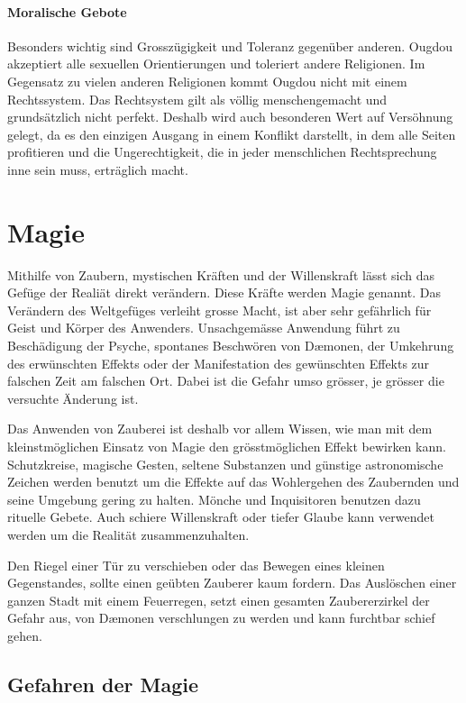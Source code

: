\documentclass[10pt,twoside,twocolumn,openany]{book}
\begin{document}
\subsubsection{Moralische Gebote}
Besonders wichtig sind Grosszügigkeit und Toleranz gegenüber anderen. Ougdou akzeptiert alle sexuellen Orientierungen und toleriert andere Religionen. Im Gegensatz zu vielen anderen Religionen kommt Ougdou nicht mit einem Rechtssystem. Das Rechtsystem gilt als völlig menschengemacht und grundsätzlich nicht perfekt. Deshalb wird auch besonderen Wert auf Versöhnung gelegt, da es den einzigen Ausgang in einem Konflikt darstellt, in dem alle Seiten profitieren und die Ungerechtigkeit, die in jeder menschlichen Rechtsprechung inne sein muss, erträglich macht.


\chapter{Magie}

Mithilfe von Zaubern, mystischen Kräften und der Willenskraft lässt sich das Gefüge der Realiät direkt verändern. Diese Kräfte werden Magie genannt. Das Verändern des Weltgefüges verleiht grosse Macht, ist aber sehr gefährlich für Geist und Körper des Anwenders. Unsachgemässe Anwendung führt zu Beschädigung der Psyche, spontanes Beschwören von D\ae monen, der Umkehrung des erwünschten Effekts oder der Manifestation des gewünschten Effekts zur falschen Zeit am falschen Ort. Dabei ist die Gefahr umso grösser, je grösser die versuchte Änderung ist.

Das Anwenden von Zauberei ist deshalb vor allem Wissen, wie man mit dem kleinstmöglichen Einsatz von Magie den grösstmöglichen Effekt bewirken kann. Schutzkreise, magische Gesten, seltene Substanzen und günstige astronomische Zeichen werden benutzt um die Effekte auf das Wohlergehen des Zaubernden und seine Umgebung gering zu halten. Mönche und Inquisitoren benutzen dazu rituelle Gebete. Auch schiere Willenskraft oder tiefer Glaube kann verwendet werden um die Realität zusammenzuhalten.

Den Riegel einer Tür zu verschieben oder das Bewegen eines kleinen Gegenstandes, sollte einen geübten Zauberer kaum fordern. Das Auslöschen einer ganzen Stadt mit einem Feuerregen, setzt einen gesamten Zaubererzirkel der Gefahr aus, von D\ae monen verschlungen zu werden und kann furchtbar schief gehen.



\section{Gefahren der Magie}
\end{document}
